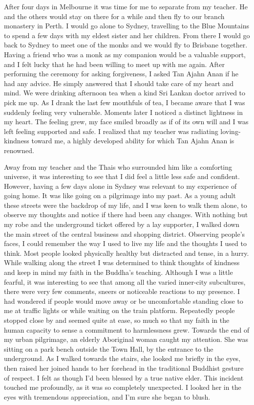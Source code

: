 After four days in Melbourne it was time for me to separate from my
teacher. He and the others would stay on there for a while and then fly
to our branch monastery in Perth. I would go alone to Sydney, travelling
to the Blue Mountains to spend a few days with my eldest sister and her
children. From there I would go back to Sydney to meet one of the monks
and we would fly to Brisbane together. Having a friend who was a monk as
my companion would be a valuable support, and I felt lucky that he had
been willing to meet up with me again. After performing the ceremony for
asking forgiveness, I asked Tan Ajahn Anan if he had any advice. He
simply answered that I should take care of my heart and mind. We were
drinking afternoon tea when a kind Sri Lankan doctor arrived to pick me
up. As I drank the last few mouthfuls of tea, I became aware that I was
suddenly feeling very vulnerable. Moments later I noticed a distinct
lightness in my heart. The feeling grew, my face smiled broadly as if of
its own will and I was left feeling supported and safe. I realized that
my teacher was radiating loving-kindness toward me, a highly developed
ability for which Tan Ajahn Anan is renowned. 

Away from my teacher and the Thais who surrounded him like a comforting
universe, it was interesting to see that I did feel a little less safe
and confident. However, having a few days alone in Sydney was relevant
to my experience of going home. It was like going on a pilgrimage into
my past. As a young adult these streets were the backdrop of my life, 
and I was keen to walk them alone, to observe my thoughts and notice if
there had been any changes. With nothing but my robe and the underground
ticket offered by a lay supporter, I walked down the main street of the
central business and shopping district. Observing people's faces, I
could remember the way I used to live my life and the thoughts I used to
think. Most people looked physically healthy but distracted and tense, 
in a hurry. While walking along the street I was determined to think
thoughts of kindness and keep in mind my faith in the Buddha's teaching. 
Although I was a little fearful, it was interesting to see that among
all the varied inner-city subcultures, there were very few comments, 
sneers or noticeable reactions to my presence. I had wondered if people
would move away or be uncomfortable standing close to me at traffic
lights or while waiting on the train platform. Repeatedly people stopped
close by and seemed quite at ease, so much so that my faith in the human
capacity to sense a commitment to harmlessness grew. Towards the end of
my urban pilgrimage, an elderly Aboriginal woman caught my attention. 
She was sitting on a park bench outside the Town Hall, by the entrance
to the underground. As I walked towards the stairs, she looked me
briefly in the eyes, then raised her joined hands to her forehead in the
traditional Buddhist gesture of respect. I felt as though I'd been
blessed by a true native elder. This incident touched me profoundly, as
it was so completely unexpected. I looked her in the eyes with
tremendous appreciation, and I'm sure she began to blush. 

